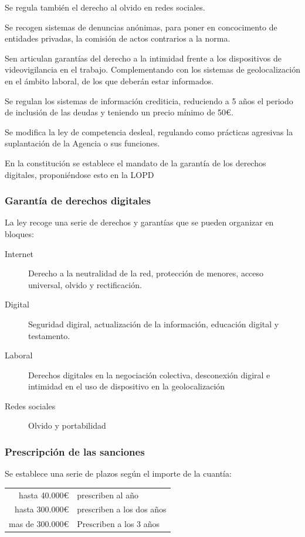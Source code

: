         Se regula también el derecho al olvido en redes sociales.

        Se recogen sistemas de denuncias anónimas, para poner en concocimento de entidades privadas, la comisión de actos contrarios a la norma.

        Sen articulan garantías del derecho a la intimidad frente a los dispositivos de videovigilancia en el trabajo. Complementando con los sistemas de geolocalización en el ámbito laboral, de los que deberán estar informados.

        Se regulan los sistemas de información crediticia, reduciendo a 5 años el periodo de inclusión de las deudas y teniendo un precio mínimo de 50€.

        Se modifica la ley de competencia desleal, regulando como prácticas agresivas la suplantación de la Agencia o sus funciones.

        En la constitución se establece el mandato de la garantía de los derechos digitales, proponiéndose esto en la LOPD

    \subsubsection{Garantía de derechos digitales}
        La ley recoge una serie de derechos y garantías que se pueden organizar en bloques:
        \begin{description}
            \item[Internet] Derecho a la neutralidad de la red, protección de menores, acceso universal, olvido y rectificación.
            \item[Digital] Seguridad digiral, actualización de la información, educación digital y testamento.
            \item[Laboral] Derechos digitales en la negociación colectiva, desconexión digiral e intimidad en el uso de dispositivo en la geolocalización
            \item[Redes sociales] Olvido y portabilidad
        \end{description}
    \subsubsection{Prescripción de las sanciones}
        Se establece una serie de plazos según el importe de la cuantía:
        \begin{table}[H]
        \begin{tabular}{rl}
            hasta 40.000€ & prescriben al año \\
            hasta 300.000€ & prescriben a los dos años \\
            mas de 300.000€ & Prescriben a los 3 años \\
        \end{tabular}
        \end{table}

